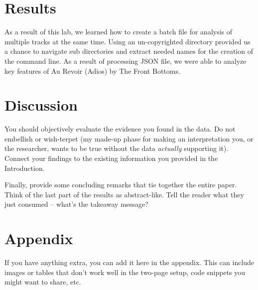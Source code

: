\documentclass{article}\usepackage[]{graphicx}\usepackage[]{xcolor}
\begin{document}
\begin{multicols}{2}
\section{Results}
As a result of this lab, we learned how to create a batch file for analysis of multiple tracks at the same time. Using an un-copyrighted directory provided us a chance to navigate sub directories and extract needed names for the creation of the command line. As a result of processing JSON file, we were able to analyze key features of Au Revoir (Adios) by The Front Bottoms. 
\columnbreak


\section{Discussion}
 You should objectively evaluate the evidence you found in the data. Do not embellish or wish-terpet (my made-up phase for making an interpretation you, or the researcher, wants to be true without the data \emph{actually} supporting it). Connect your findings to the existing information you provided in the Introduction.

Finally, provide some concluding remarks that tie together the entire paper. Think of the last part of the results as abstract-like. Tell the reader what they just consumed -- what's the takeaway message?

\vspace{2em}


\begin{tiny}

\end{tiny}
\end{multicols}

\newpage
\onecolumn
\section{Appendix}

If you have anything extra, you can add it here in the appendix. This can include images or tables that don't work well in the two-page setup, code snippets you might want to share, etc.
\end{document}
